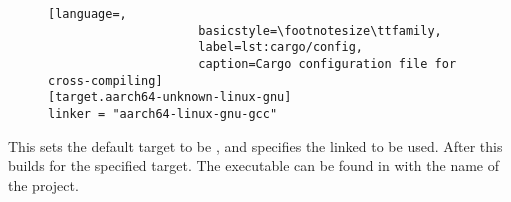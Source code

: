 \documentclass[a4paper,twoside]{report}
\begin{document}
\begin{appendices}
\begin{figure}[ht]
\begin{lstlisting}[language=,
                     basicstyle=\footnotesize\ttfamily,
                     label=lst:cargo/config,
                     caption=Cargo configuration file for cross-compiling]
[target.aarch64-unknown-linux-gnu]
linker = "aarch64-linux-gnu-gcc"
  \end{lstlisting}
  \end{figure}
  This sets the default target to be ,
  and specifies the linked to be used.
  After this  builds for the specified target.
  The executable can be found in 
  with the name of the project.




\end{appendices}



\end{document}
